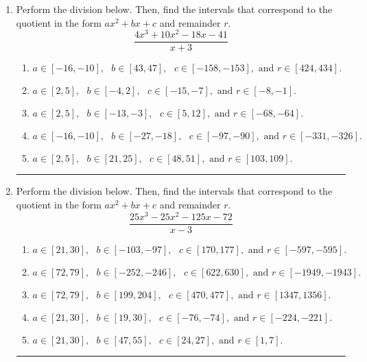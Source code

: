 \documentclass[14pt]{extbook}
\newcommand{\litem}[1]{\item#1\hspace*{-1cm}\rule{\textwidth}{0.4pt}}
\begin{document}
\begin{enumerate}
{\begin{enumerate}[label=\Alph*.]
\end{enumerate} }
\litem{
Perform the division below. Then, find the intervals that correspond to the quotient in the form $ax^2+bx+c$ and remainder $r$.\[ \frac{4x^{3} +10 x^{2} -18 x -41}{x + 3} \]\begin{enumerate}[label=\Alph*.]
\item \( a \in [-16, -10], \text{   } b \in [43, 47], \text{   } c \in [-158, -153], \text{   and   } r \in [424, 434]. \)
\item \( a \in [2, 5], \text{   } b \in [-4, 2], \text{   } c \in [-15, -7], \text{   and   } r \in [-8, -1]. \)
\item \( a \in [2, 5], \text{   } b \in [-13, -3], \text{   } c \in [5, 12], \text{   and   } r \in [-68, -64]. \)
\item \( a \in [-16, -10], \text{   } b \in [-27, -18], \text{   } c \in [-97, -90], \text{   and   } r \in [-331, -326]. \)
\item \( a \in [2, 5], \text{   } b \in [21, 25], \text{   } c \in [48, 51], \text{   and   } r \in [103, 109]. \)

\end{enumerate} }
\litem{
Perform the division below. Then, find the intervals that correspond to the quotient in the form $ax^2+bx+c$ and remainder $r$.\[ \frac{25x^{3} -25 x^{2} -125 x -72}{x -3} \]\begin{enumerate}[label=\Alph*.]
\item \( a \in [21, 30], \text{   } b \in [-103, -97], \text{   } c \in [170, 177], \text{   and   } r \in [-597, -595]. \)
\item \( a \in [72, 79], \text{   } b \in [-252, -246], \text{   } c \in [622, 630], \text{   and   } r \in [-1949, -1943]. \)
\item \( a \in [72, 79], \text{   } b \in [199, 204], \text{   } c \in [470, 477], \text{   and   } r \in [1347, 1356]. \)
\item \( a \in [21, 30], \text{   } b \in [19, 30], \text{   } c \in [-76, -74], \text{   and   } r \in [-224, -221]. \)
\item \( a \in [21, 30], \text{   } b \in [47, 55], \text{   } c \in [24, 27], \text{   and   } r \in [1, 7]. \)


\end{enumerate}}
\end{enumerate}
\end{document}
